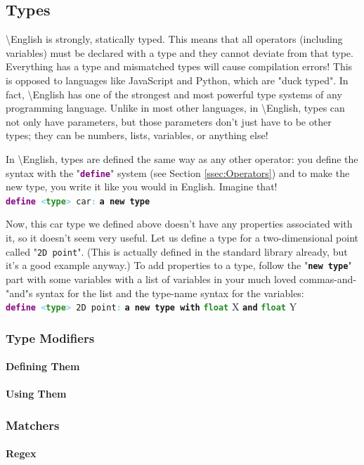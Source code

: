 \documentclass{article}
\newcommand{\English}{\textbackslash{}English}				%
\newcommand{\ssecl}[1]{\subsection{#1}\label{ssec:#1}}
\newcommand{\sssecl}[1]{\subsubsection{#1}\label{sssec:#1}}
\newcommand{\type}[1]{\texttt{\textcolor{ForestGreen}{\textbf{#1}}}}
\newcommand{\keyop}[1]{\texttt{\textcolor{Purple}{\textbf{#1}}}}
\newcommand{\common}[1]{\texttt{\textcolor{Mulberry}{\textbf{#1}}}}
\newcommand{\defpunct}[1]{\texttt{\textcolor{SkyBlue}{\textbf{#1}}}}
\newcommand{\define}[2]{\texttt{\keyop{define} \defpunct{<}#1\defpunct{>} #2\defpunct{:}}}
\newenvironment{code}[0]
{\ttfamily{}				%
\setlength\parindent{0cm}	%
~\\}
{\setlength\parindent{1cm}
~\\}
\begin{document}
\ssecl{Types}
\indent \English{} is strongly, statically typed. This means that all operators (including variables) must be declared with a type and they cannot deviate from that type. Everything has a type and mismatched types will cause compilation errors! This is opposed to languages like JavaScript and Python, which are "duck typed".
\indent In fact, \English{} has one of the strongest and most powerful type systems of any programming language. Unlike in most other languages, in \English{}, types can not only have parameters, but those parameters don't just have to be other types; they can be numbers, lists, variables, or anything else!

\indent In \English{}, types are defined the same way as any other operator: you define the syntax with the "\keyop{define}" system (see Section \ref{ssec:Operators}) and to make the new type, you write it like you would in English. Imagine that!
\begin{code}
\define{\type{type}}{car}
\qquad{}\common{a new type}
\end{code}

\indent Now, this car type we defined above doesn't have any properties associated with it, so it doesn't seem very useful. Let us define a type for a two-dimensional point called "\texttt{2D point}". (This is actually defined in the standard library already, but it's a good example anyway.) To add properties to a type, follow the "\common{new type}" part with some variables with a list of variables in your much loved commas-and-"and"s syntax for the list and the type-name syntax for the variables:
\begin{code}
\define{\type{type}}{2D point}
\qquad{}\common{a new type with} \type{float} X \common{and} \type{float} Y
\end{code}


\sssecl{Type Modifiers}
\paragraph{Defining Them}

\paragraph{Using Them}

\sssecl{Matchers}
\paragraph{Regex} \label{par:Regex}
\end{document}
